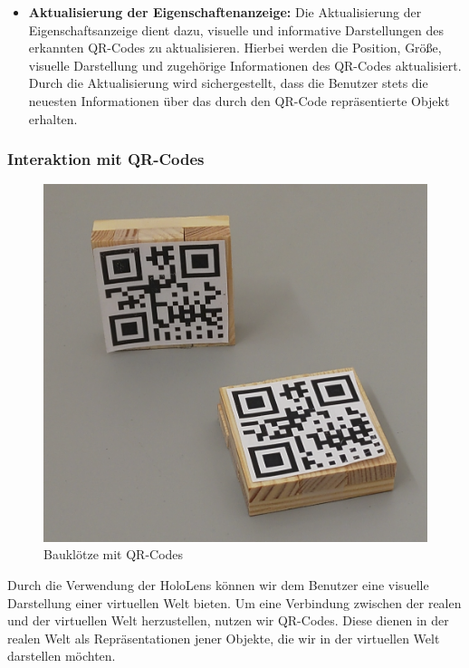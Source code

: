 \begin{itemize}
\begin{itemize}
    \item \textbf{Aktualisierung der Eigenschaftenanzeige:}
    Die Aktualisierung der Eigenschaftsanzeige dient dazu, visuelle und informative Darstellungen des erkannten QR-Codes zu
    aktualisieren. Hierbei werden die Position, Größe, visuelle Darstellung und zugehörige Informationen des QR-Codes aktualisiert.
    Durch die Aktualisierung wird sichergestellt, dass die Benutzer stets die neuesten Informationen über das durch den QR-Code
    repräsentierte Objekt erhalten.

\end{itemize}

\subsubsection{Interaktion mit QR-Codes}
\begin{figure}[H]
    \centering
    \includegraphics[scale=0.3, angle=0]{images/bauklotz}
    \caption{Bauklötze mit QR-Codes}
    \label{fig:bauklotz}
\end{figure}

Durch die Verwendung der HoloLens können wir dem Benutzer eine visuelle Darstellung einer virtuellen Welt bieten. Um eine
Verbindung zwischen der realen und der virtuellen Welt herzustellen, nutzen wir QR-Codes.  Diese dienen in der realen Welt als Repräsentationen jener Objekte, die wir in der virtuellen Welt darstellen möchten.


\end{itemize}
